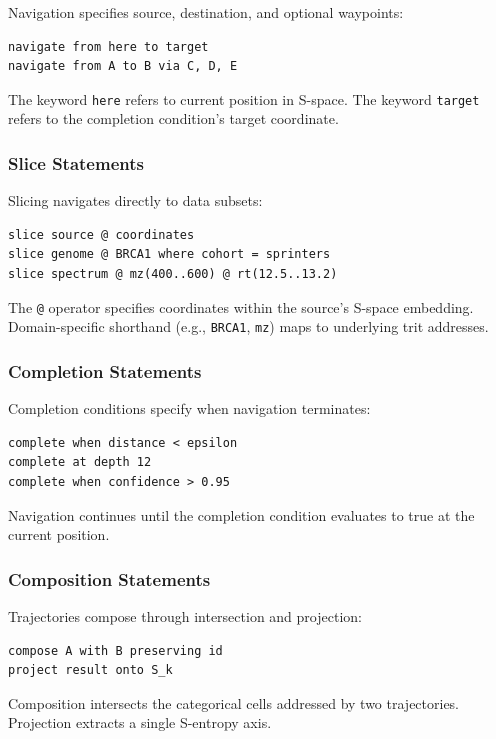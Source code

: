 \documentclass[10pt,twocolumn]{article}
\theoremstyle{definition}
\theoremstyle{remark}
\begin{document}
Navigation specifies source, destination, and optional waypoints:
\begin{lstlisting}
navigate from here to target
navigate from A to B via C, D, E
\end{lstlisting}

The keyword \texttt{here} refers to current position in S-space. The keyword \texttt{target} refers to the completion condition's target coordinate.

\subsubsection{Slice Statements}

Slicing navigates directly to data subsets:
\begin{lstlisting}
slice source @ coordinates
slice genome @ BRCA1 where cohort = sprinters
slice spectrum @ mz(400..600) @ rt(12.5..13.2)
\end{lstlisting}

The \texttt{@} operator specifies coordinates within the source's S-space embedding. Domain-specific shorthand (e.g., \texttt{BRCA1}, \texttt{mz}) maps to underlying trit addresses.

\subsubsection{Completion Statements}

Completion conditions specify when navigation terminates:
\begin{lstlisting}
complete when distance < epsilon
complete at depth 12
complete when confidence > 0.95
\end{lstlisting}

Navigation continues until the completion condition evaluates to true at the current position.

\subsubsection{Composition Statements}

Trajectories compose through intersection and projection:
\begin{lstlisting}
compose A with B preserving id
project result onto S_k
\end{lstlisting}

Composition intersects the categorical cells addressed by two trajectories. Projection extracts a single S-entropy axis.
\end{document}
